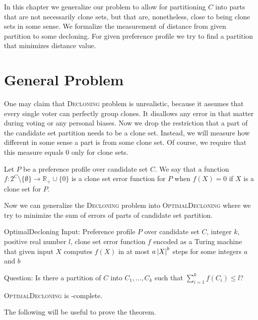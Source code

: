 In this chapter we generalize our problem to allow for partitioning $C$ into parts
that are not necessarily clone sets, but that are, nonetheless, close to being clone sets in some sense.
We formalize the measurement of distance from given partition to some decloning.
For given preference profile we try to find a partition that minimizes distance value.

\section{General Problem}

One may claim that \textsc{Decloning} problem is unrealistic,
because it assumes that every single voter can perfectly group clones.
It disallows any error in that matter during voting or any personal biases.
Now we drop the restriction that a part of the candidate set partition needs to be a clone set.
Instead, we will measure how different in some sense a part is from some clone set.
Of course, we require that this measure equals $0$ only for clone sets.

\begin{defn}
Let $P$ be a preference profile over candidate set $C$.
We say that a function
$f: 2^C \setminus \{\emptyset\} \rightarrow \mathbb{R}_+\cup\{0\}$
is a clone set error function for $P$ when $f(X) = 0$ if $X$ is a clone set for $P$.
\end{defn}

Now we can generalize the \textsc{Decloning} problem into \textsc{OptimalDecloning}
where we try to minimize the sum of errors of parts of candidate set partition.

\begin{problem}{OptimalDecloning}
	Input: Preference profile $P$ over candidate set $C$, integer $k$, positive real number $l$,
        clone set error function $f$ encoded as a Turing machine that given input $X$ computes $f(X)$
        in at most $a \left\vert X \right\vert^b$ steps for some integers $a$ and $b$

	Question: Is there a partition of $C$ into $C_1, ..., C_k$ such that $\sum_{i=1}^k f(C_i) \leq l$?
\end{problem}

\begin{thm} \label{optdecl}
	\textsc{OptimalDecloning} is \np-complete.
\end{thm}

The following will be useful to prove the theorem.

